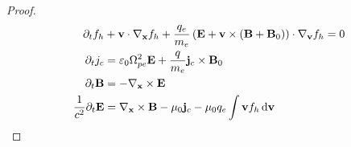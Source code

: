 \begin{proof}
  \begin{align}
      \partial_t f_h &+ \vb{v}\cdot\nabla_{\vb{x}} f_h + \frac{q_e}{m_e}\left( \vb{E} + \vb{v}\times(\vb{B}+\vb{B}_0) \right)\cdot\nabla_{\vb{v}} f_h = 0 \\
      \partial_t j_c &= \varepsilon_0\Omega_{pe}^2\vb{E} + \frac{q}{m_e}\vb{j}_c\times\vb{B}_0 \\
      \partial_t\vb{B} &= -\nabla_{\vb{x}}\times\vb{E} \\
      \frac{1}{c^2}\partial_t\vb{E} &= \nabla_{\vb{x}}\times\vb{B} - \mu_0\vb{j}_c - \mu_0q_e\int\vb{v}f_h\dd{\vb{v}}
  \end{align}
\end{proof}



